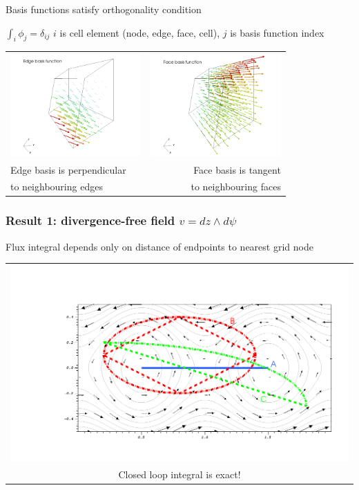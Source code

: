 \documentclass[aspectratio=169]{beamer}
\begin{document}
\begin{frame}[fragile]{Basis functions satisfy orthogonality condition}

\begin{block}{$\int_i \phi_j = \delta_{ij}$}
   $i$ is cell element (node, edge, face, cell), $j$ is basis function index
 \end{block}
  \begin{tabular}{lr}
      \includegraphics[width=50mm]{hexEdge.png} &                        \includegraphics[width=50mm]{hexFace.png} \\
      {Edge basis is perpendicular } & {Face basis is tangent }  \\
      {to neighbouring edges} & {to neighbouring faces}
\end{tabular}

\end{frame}

\begin{frame}[t]
  \frametitle{Result 1: divergence-free field  $v = dz \wedge d\psi$}
  \begin{block}{Flux integral depends only on distance of endpoints to nearest grid node}
  \end{block}
  \begin{tabular}{c}
    \includegraphics[width=.7\linewidth]{flow.png} \\
    Closed loop integral is exact!
  \end{tabular}
\end{frame}
\end{document}
